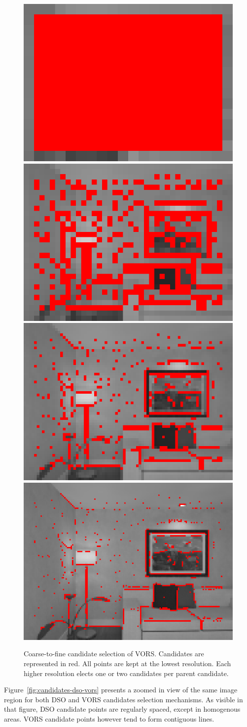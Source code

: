 \begin{figure}[ht]
	\centering
	\includegraphics[width=0.23\linewidth]{assets/img/candidates-icl-4.png}
	\hfill
	\includegraphics[width=0.23\linewidth]{assets/img/candidates-icl-3.png}
	\hfill
	\includegraphics[width=0.23\linewidth]{assets/img/candidates-icl-2.png}
	\hfill
	\includegraphics[width=0.23\linewidth]{assets/img/candidates-icl-1.png}
	\caption{Coarse-to-fine candidate selection of VORS.
	Candidates are represented in red.
	All points are kept at the lowest resolution.
	Each higher resolution elects one or two candidates per parent candidate.}%
	\label{fig:coarse-to-fine-candidates}
\end{figure}

Figure~\ref{fig:candidates-dso-vors} presents a zoomed in view of the same image region
for both DSO and VORS candidates selection mechanisms.
As visible in that figure, DSO candidate points are regularly spaced,
except in homogenous areas.
VORS candidate points however tend to form contiguous lines.

